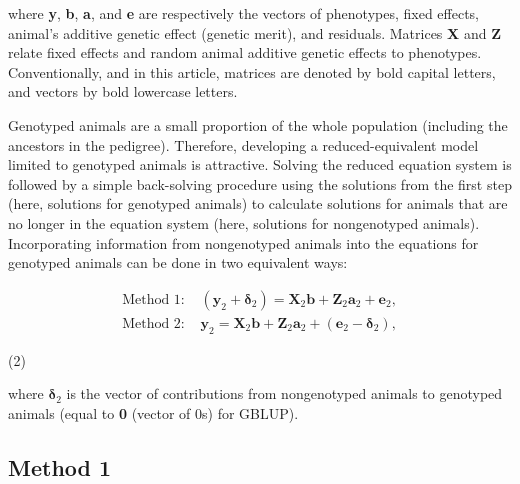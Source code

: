 \documentclass[authordate, empirical]{jote-new-article}
\begin{document}
	where \textbf{y}, \textbf{b}, \textbf{a}, and \textbf{e} are respectively the vectors of phenotypes, fixed effects, animal's additive genetic effect (genetic merit), and residuals. Matrices \textbf{X} and \textbf{Z} relate fixed effects and random animal additive genetic effects to phenotypes. Conventionally, and in this article, matrices are denoted by bold capital letters, and vectors by bold lowercase letters.



	Genotyped animals are a small proportion of the whole population (including the ancestors in the pedigree). Therefore, developing a reduced-equivalent model limited to genotyped animals is attractive. Solving the reduced equation system is followed by a simple back-solving procedure using the solutions from the first step (here, solutions for genotyped animals) to calculate solutions for animals that are no longer in the equation system (here, solutions for nongenotyped animals). Incorporating information from nongenotyped animals into the equations for genotyped animals can be done in two equivalent ways:



	\begin{equation*}
    \begin{split}
        \text{Method 1: }&(\textbf{y}_2+\textbf{δ}_2 )=\textbf{X}_2 \textbf{b}+\textbf{Z}_2 \textbf{a}_2+\textbf{e}_2,\\
        \text{Method 2: }&\textbf{y}_2=\textbf{X}_2 \textbf{b}+\textbf{Z}_2 \textbf{a}_2+(\textbf{e}_2-\textbf{δ}_2 ),
    \end{split}
\end{equation*}

\vspace{-1.5\baselineskip}
\begin{center}
		(2)
	\end{center}

	where $\textbf{δ}_2$ is the vector of contributions from nongenotyped animals to genotyped animals (equal to \textbf{0} (vector of 0s) for GBLUP).



	\subsection{Method 1}
\end{document}
